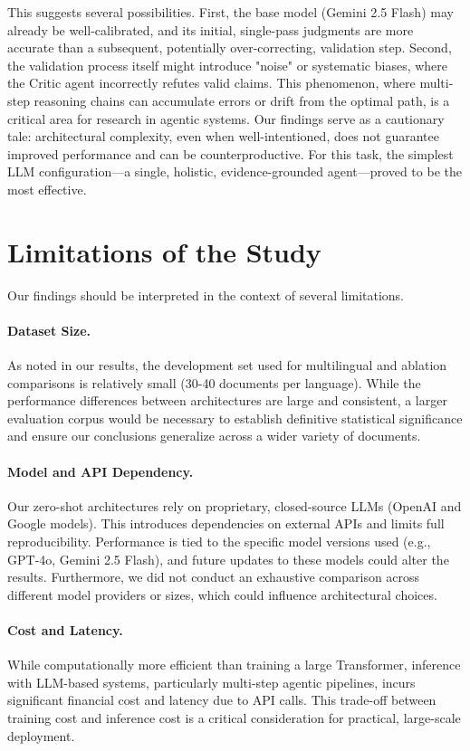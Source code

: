 This suggests several possibilities. First, the base model (Gemini 2.5 Flash) may already be well-calibrated, and its initial, single-pass judgments are more accurate than a subsequent, potentially over-correcting, validation step. Second, the validation process itself might introduce "noise" or systematic biases, where the Critic agent incorrectly refutes valid claims. This phenomenon, where multi-step reasoning chains can accumulate errors or drift from the optimal path, is a critical area for research in agentic systems. Our findings serve as a cautionary tale: architectural complexity, even when well-intentioned, does not guarantee improved performance and can be counterproductive. For this task, the simplest LLM configuration—a single, holistic, evidence-grounded agent—proved to be the most effective.

\section{Limitations of the Study}

Our findings should be interpreted in the context of several limitations.

\paragraph{Dataset Size.}
As noted in our results, the development set used for multilingual and ablation comparisons is relatively small (30-40 documents per language). While the performance differences between architectures are large and consistent, a larger evaluation corpus would be necessary to establish definitive statistical significance and ensure our conclusions generalize across a wider variety of documents.

\paragraph{Model and API Dependency.}
Our zero-shot architectures rely on proprietary, closed-source LLMs (OpenAI and Google models). This introduces dependencies on external APIs and limits full reproducibility. Performance is tied to the specific model versions used (e.g., GPT-4o, Gemini 2.5 Flash), and future updates to these models could alter the results. Furthermore, we did not conduct an exhaustive comparison across different model providers or sizes, which could influence architectural choices.

\paragraph{Cost and Latency.}
While computationally more efficient than training a large Transformer, inference with LLM-based systems, particularly multi-step agentic pipelines, incurs significant financial cost and latency due to API calls. This trade-off between training cost and inference cost is a critical consideration for practical, large-scale deployment.

